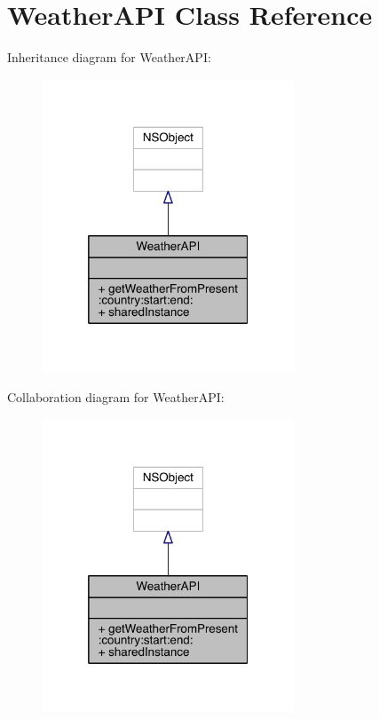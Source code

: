 \hypertarget{interface_weather_a_p_i}{\section{Weather\-A\-P\-I Class Reference}
\label{interface_weather_a_p_i}
}


Inheritance diagram for Weather\-A\-P\-I\-:\nopagebreak
\begin{figure}[H]
\begin{center}
\leavevmode
\includegraphics[width=212pt]{interface_weather_a_p_i__inherit__graph}
\end{center}
\end{figure}


Collaboration diagram for Weather\-A\-P\-I\-:\nopagebreak
\begin{figure}[H]
\begin{center}
\leavevmode
\includegraphics[width=212pt]{interface_weather_a_p_i__coll__graph}
\end{center}
\end{figure}

